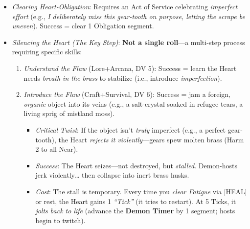 \documentclass[12pt]{article}
\begin{document}
\begin{itemize}
\begin{itemize}
\begin{itemize}
\begin{itemize}
        \item \textit{Refuse}: No immediate cost, but the Heart's whisper lingers---gain 1 Fatigue (the strain of resisting its \textit{help}).
      \end{itemize}
      \item \textit{Clearing Heart-Obligation}: Requires an Act of Service celebrating \textit{imperfect effort} (e.g., \textit{I deliberately miss this gear-tooth on purpose, letting the scrape be uneven}). Success = clear 1 Obligation segment.
      \item \textit{Silencing the Heart (The Key Step)}: \textbf{Not a single roll}---a multi-step process requiring specific skills:
      \begin{enumerate}
        \item \textit{Understand the Flaw} (Lore+Arcana, DV 5): Success = learn the Heart needs \textit{breath in the brass} to stabilize (i.e., introduce \textit{imperfection}).
        \item \textit{Introduce the Flaw} (Craft+Survival, DV 6): Success = jam a foreign, \textit{organic} object into its veins (e.g., a salt-crystal soaked in refugee tears, a living sprig of mistland moss).
        \begin{itemize}
          \item \textit{Critical Twist}: If the object isn't \textit{truly} imperfect (e.g., a perfect gear-tooth), the Heart \textit{rejects it violently}---gears spew molten brass (Harm 2 to all Near).
          \item \textit{Success}: The Heart seizes---not destroyed, but \textit{stalled}. Demon-hosts jerk violently\ldots{} then collapse into inert brass husks.
          \item \textit{Cost}: The stall is temporary. Every time you \textit{clear Fatigue} via [HEAL] or rest, the Heart gains 1 \textit{``Tick''} (it tries to restart). At 5 Ticks, it \textit{jolts back to life} (advance the \textbf{Demon Timer } by 1 segment; hosts begin to twitch).
        \end{itemize}
      \end{enumerate}
    \end{itemize}
  \end{itemize}
\end{itemize}
\end{document}
